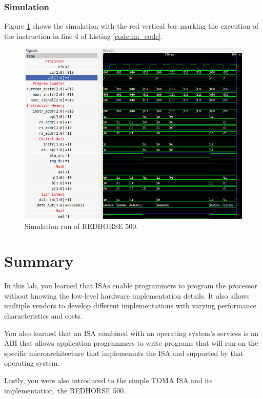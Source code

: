 \documentclass[a4paper, 11pt,oneside]{article}
\begin{document}
\subsubsection{Simulation}
Figure \ref{fig:sim} shows the simulation with the red vertical bar marking the 
execution of the instruction in line 4 of Listing \ref{code:im_code}.

\begin{figure}[H]
	\begin{center}
	\includegraphics[width=6in]{sim.png}
	\caption{Simulation run of REDHORSE 500.}
	\label{fig:sim} 
	\end{center}
\end{figure}


\section{Summary}
In this lab, you learned that ISAs enable programmers to program the processor 
without knowing the low-level hardware implementation details. It also allows 
multiple vendors to develop different implementations with varying  
performance characteristics and costs. 

You also learned that an ISA combined with an operating system's services 
is an ABI that allows application programmers to write programs that will run 
on the specific microarchitecture that implememnts the ISA and supported by 
that operating system.

Lastly, you were also introduced to the simple TOMA ISA and its implementation, 
the REDHORSE 500.
\end{document}
